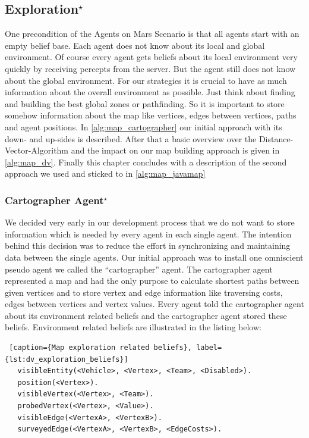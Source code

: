 \subsection[Exploration]{Exploration$^\star$}\label{alg:exploration}
One precondition of the Agents on Mars Scenario is that all agents start with an empty belief base. Each agent does not know about its local and global environment. Of course every agent gets beliefs about its local environment very quickly by receiving percepts from the server. But the agent still does not know about the global environment. For our strategies it is crucial to have as much information about the overall environment as possible. Just think about finding and building the best global zones or pathfinding. So it is important to store somehow information about the map like vertices, edges between vertices, paths and agent positions. In \autoref{alg:map_cartographer} our initial approach with its down- and up-sides is described. After that a basic overview over the Distance-Vector-Algorithm and the impact on our map building approach is given in \autoref{alg:map_dv}. Finally this chapter concludes with a description of the second approach we used and sticked to in \autoref{alg:map_javamap}


\subsubsection[Cartographer Agent]{Cartographer Agent$^\star$}\label{alg:map_cartographer}
We decided very early in our development process that we do not want to store information which is needed by every agent in each single agent. The intention behind this decision was to reduce the effort in synchronizing and maintaining data between the single agents. Our initial approach was to install one omniscient pseudo agent we called the ``cartographer'' agent. The cartographer agent represented a map and had the only purpose to calculate shortest paths between given vertices and to store vertex and edge information like traversing costs, edges between vertices and vertex values. Every agent told the cartographer agent about its environment related beliefs and the cartographer agent stored these beliefs. Environment related beliefs are illustrated in the listing below:

\begin{lstlisting} [caption={Map exploration related beliefs}, label={lst:dv_exploration_beliefs}]
   visibleEntity(<Vehicle>, <Vertex>, <Team>, <Disabled>).
   position(<Vertex>).
   visibleVertex(<Vertex>, <Team>).
   probedVertex(<Vertex>, <Value>).
   visibleEdge(<VertexA>, <VertexB>).
   surveyedEdge(<VertexA>, <VertexB>, <EdgeCosts>).
\end{lstlisting}

